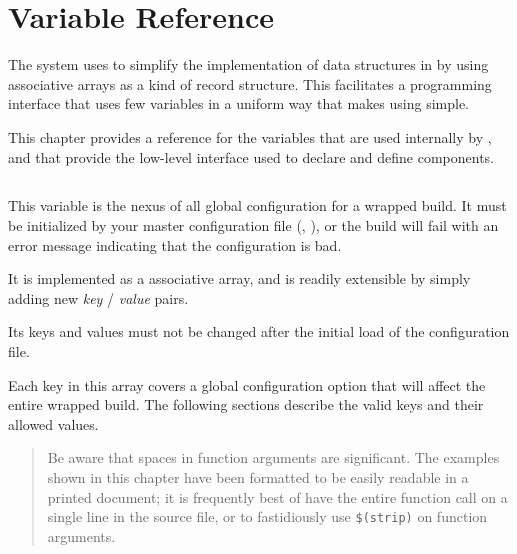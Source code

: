 %
%
%
%
\chapter{Variable Reference}

The \lmsbw system uses \gmsl to simplify the implementation of data
structures in \make by using associative arrays as a kind of record
structure.  This facilitates a programming interface that uses few
variables in a uniform way that makes using \lmsbw simple.

This chapter provides a reference for the variables that are used
internally by \lmsbw, and that provide the low-level interface used to
declare and define components.

\section{\lmsbwconfiguration}\label{variables:lmsbw-configuration}

This variable is the nexus of all global configuration for a wrapped
build.  It must be initialized by your master configuration file
(, ), or the
build will fail with an error message indicating that the
configuration is bad.

It is implemented as a \gmsl associative array, and is readily
extensible by simply adding new \emph{key} / \emph{value} pairs.

Its keys and values must not be changed after the initial load of the
configuration file.

Each key in this array covers a global configuration option that will
affect the entire wrapped build.  The following sections describe the
valid keys and their allowed values.

\begin{quote}
Be aware that spaces in \gnumake function arguments are significant.
The examples shown in this chapter have been formatted to be easily
readable in a printed document; it is frequently best of have the
entire function call on a single line in the source file, or to
fastidiously use \texttt{\$(strip)} on function arguments.
\end{quote}

